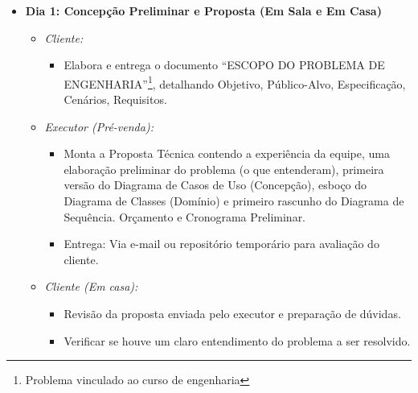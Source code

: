 \documentclass[12pt,a4paper]{article}
\begin{document}
\begin{itemize}[leftmargin=*]
  \begin{itemize}
    \item \textbf{Dia 1: Concepção Preliminar e Proposta (Em Sala e Em Casa)}
    \begin{itemize}
      \item \textit{Cliente:}
      \begin{itemize}
        \item Elabora e entrega o documento ``ESCOPO DO PROBLEMA DE ENGENHARIA''\footnote{Problema vinculado ao curso de engenharia}, detalhando Objetivo, Público-Alvo, Especificação, Cenários, Requisitos.
      \end{itemize}
      \item \textit{Executor (Pré-venda):}
      \begin{itemize}
        \item Monta a Proposta Técnica contendo a experiência da equipe, uma elaboração preliminar do problema (o que entenderam), primeira versão do Diagrama de Casos de Uso (Concepção), esboço do Diagrama de Classes (Domínio) e primeiro rascunho do Diagrama de Sequência. Orçamento e Cronograma Preliminar.
        \item Entrega: Via e-mail ou repositório temporário para avaliação do cliente.
      \end{itemize}
      \item \textit{Cliente (Em casa):}
      \begin{itemize}
        \item Revisão da proposta enviada pelo executor e preparação de dúvidas.
        \item Verificar se houve um claro entendimento do problema a ser resolvido.
      \end{itemize}
    \end{itemize}


\end{itemize}
\end{itemize}
\end{document}
